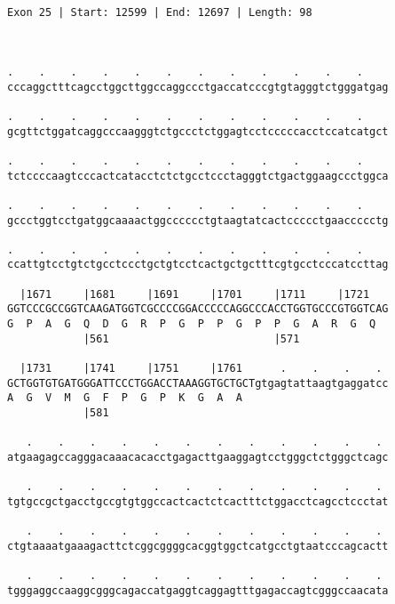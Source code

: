 \documentclass{article}
\begin{document}
\begin{Verbatim}
                                                      
 
Exon 25 | Start: 12599 | End: 12697 | Length: 98



.    .    .    .    .    .    .    .    .    .    .    .    
cccaggctttcagcctggcttggccaggccctgaccatcccgtgtagggtctgggatgag
                                                            
.    .    .    .    .    .    .    .    .    .    .    .    
gcgttctggatcaggcccaagggtctgccctctggagtcctcccccacctccatcatgct
                                                            
.    .    .    .    .    .    .    .    .    .    .    .    
tctccccaagtcccactcatacctctctgcctccctagggtctgactggaagccctggca
                                                            
.    .    .    .    .    .    .    .    .    .    .    .    
gccctggtcctgatggcaaaactggcccccctgtaagtatcactccccctgaaccccctg
                                                            
.    .    .    .    .    .    .    .    .    .    .    .    
ccattgtcctgtctgcctccctgctgtcctcactgctgctttcgtgcctcccatccttag
                                                            
  |1671     |1681     |1691     |1701     |1711     |1721   
GGTCCCGCCGGTCAAGATGGTCGCCCCGGACCCCCAGGCCCACCTGGTGCCCGTGGTCAG
G  P  A  G  Q  D  G  R  P  G  P  P  G  P  P  G  A  R  G  Q  
            |561                          |571              
  
  |1731     |1741     |1751     |1761      .    .    .    . 
GCTGGTGTGATGGGATTCCCTGGACCTAAAGGTGCTGCTgtgagtattaagtgaggatcc
A  G  V  M  G  F  P  G  P  K  G  A  A                       
            |581                                            
  
   .    .    .    .    .    .    .    .    .    .    .    . 
atgaagagccagggacaaacacacctgagacttgaaggagtcctgggctctgggctcagc
                                                            
   .    .    .    .    .    .    .    .    .    .    .    . 
tgtgccgctgacctgccgtgtggccactcactctcactttctggacctcagcctccctat
                                                            
   .    .    .    .    .    .    .    .    .    .    .    . 
ctgtaaaatgaaagacttctcggcggggcacggtggctcatgcctgtaatcccagcactt
                                                            
   .    .    .    .    .    .    .    .    .    .    .    . 
tgggaggccaaggcgggcagaccatgaggtcaggagtttgagaccagtcgggccaacata
                                                            

\end{Verbatim}
\end{document}
